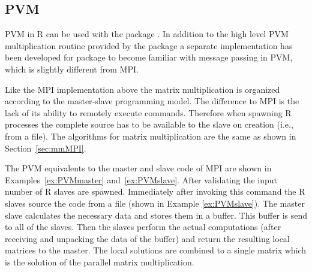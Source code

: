 \subsection{PVM}

PVM in R can be used with the package . In addition to the
high level PVM multiplication routine provided by the package
 a separate implementation has been developed for package
 to become familiar with message passing in PVM, which is
slightly different from MPI. 

Like the MPI implementation above the matrix multiplication is
organized according 
to the master-slave programming model. The difference to MPI is the
lack of its ability to remotely execute commands. Therefore when
spawning R processes the complete source has to be available to the
slave on creation (i.e., from a file). The algorithms for matrix
multiplication are the same as shown in Section~\ref{sec:mmMPI}.

The PVM equivalents to the master and slave code of MPI are shown in
Examples~\ref{ex:PVMmaster} and~\ref{ex:PVMslave}.
After validating the input  number of R slaves are
spawned. Immediately after invoking this command the R slaves source
the code from a file  (shown in Example
\ref{ex:PVMslave}). The master slave
calculates the necessary data and stores them in a buffer. This buffer
is send to all of the slaves. Then
the slaves perform the actual computations (after receiving and
unpacking the data of the buffer) and return the resulting
local matrices to the master. The local solutions are combined to a
single matrix which is the solution of the parallel matrix
multiplication.


